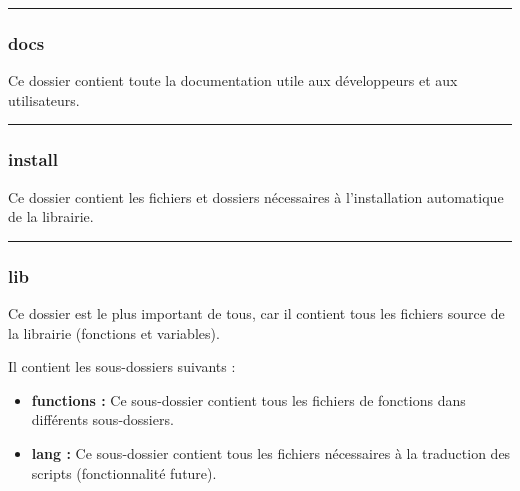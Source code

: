 \documentclass[a4paper,10pt]{article}
\begin{document}

\color{blue}\par\noindent\rule{\textwidth}{0.4pt}\color{white}

\color{blue}
\subsubsection{docs}\color{white}

\begin{justify}
    Ce dossier contient toute la documentation utile aux développeurs et aux utilisateurs.
\end{justify}



\color{blue}\par\noindent\rule{\textwidth}{0.4pt}\color{white}

\color{blue}
\subsubsection{install}\color{white}

\begin{justify}
    Ce dossier contient les fichiers et dossiers nécessaires à l'installation automatique de la librairie.
\end{justify}



\color{blue}\par\noindent\rule{\textwidth}{0.4pt}\color{white}

\color{blue}
\subsubsection{lib}\color{white}

\begin{justify}
    Ce dossier est le plus important de tous, car il contient tous les fichiers source de la librairie (fonctions et variables).
\end{justify}


\begin{justify}
    Il contient les sous-dossiers suivants :

    \begin{itemize}
        \item \textbf{\color{lime}functions\color{white} :} Ce sous-dossier contient tous les fichiers de fonctions dans différents sous-dossiers.\\

        \item \textbf{\color{lime}lang\color{white} :} Ce sous-dossier contient tous les fichiers nécessaires à la traduction des scripts (fonctionnalité future).
    \end{itemize}
\end{justify}
\end{document}
